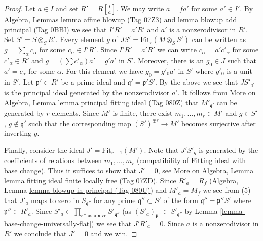 \documentclass{amsart}
\theoremstyle{plain}
\theoremstyle{definition}
\theoremstyle{remark}
\numberwithin{equation}{subsection}
\begin{document}
\begin{proof}
\medskip\noindent
Let $a \in I$ and set $R' = R[\frac{I}{a}]$. We may write $a = fa'$
for some $a' \in I'$. By Algebra, Lemmas \href{https://stacks.math.columbia.edu/tag/07Z3}{lemma affine blowup (Tag 07Z3)} and
\href{https://stacks.math.columbia.edu/tag/0BBI}{lemma blowup add principal (Tag 0BBI)} we see that $I' R' = a'R'$
and $a'$ is a nonzerodivisor in $R'$. Set $S' = S \otimes_S R'$.
Every element $g$ of $JS' = \text{Fit}_r(M \otimes_S S')$ can be
written as $g = \sum_\alpha c_\alpha$ for some $c_\alpha \in I'R'$.
Since $I'R' = a'R'$ we can write $c_\alpha = a'c'_\alpha$ for some
$c'_\alpha \in R'$ and $g = (\sum c'_\alpha)a' = g' a'$ in $S'$.
Moreover, there is an $g_0 \in J$ such that $a' = c_\alpha$
for some $\alpha$. For this element we have $g_0 = g'_0 a'$ in $S'$
where $g'_0$ is a unit in $S'$.
Let $\mathfrak p' \subset R'$ be
a prime ideal and $\mathfrak q' = \mathfrak p'S'$.
By the above we see that $JS'_{\mathfrak q'}$ is the
principal ideal generated by the nonzerodivisor $a'$.
It follows from More on Algebra, Lemma
\href{https://stacks.math.columbia.edu/tag/080Z}{lemma principal fitting ideal (Tag 080Z)}
that $M'_{\mathfrak q'}$ can be generated by $r$ elements.
Since $M'$ is finite, there exist $m_1, \ldots, m_r \in M'$ and
$g \in S'$, $g \not \in \mathfrak q'$ such that the corresponding map
$(S')^{\oplus r} \to M'$ becomes surjective after inverting $g$.

\medskip\noindent
Finally, consider the ideal $J' = \text{Fit}_{r - 1}(M')$.
Note that $J'S'_g$ is generated by the coefficients of relations between
$m_1, \ldots, m_r$ (compatibility of Fitting ideal with base change).
Thus it suffices to show that $J' = 0$, see
More on Algebra, Lemma
\href{https://stacks.math.columbia.edu/tag/07ZD}{lemma fitting ideal finite locally free (Tag 07ZD)}.
Since $R'_a = R_f$ (Algebra, Lemma \href{https://stacks.math.columbia.edu/tag/080U}{lemma blowup in principal (Tag 080U)})
and $M'_a = M_f$ we see from (5)
that $J'_a$ maps to zero in $S_{\mathfrak q''}$ for any prime
$\mathfrak q'' \subset S'$ of the form $\mathfrak q'' = \mathfrak p''S'$
where $\mathfrak p'' \subset R'_a$. Since
$S'_a \subset \prod_{\mathfrak q''\text{ as above}} S'_{\mathfrak q''}$
(as $(S'_a)_{\mathfrak p''} \subset S'_{\mathfrak q''}$ by
Lemma \ref{lemma-base-change-universally-flat})
we see that $J'R'_a = 0$. Since $a$ is a nonzerodivisor in $R'$ we
conclude that $J' = 0$ and we win.
\end{proof}
\end{document}
